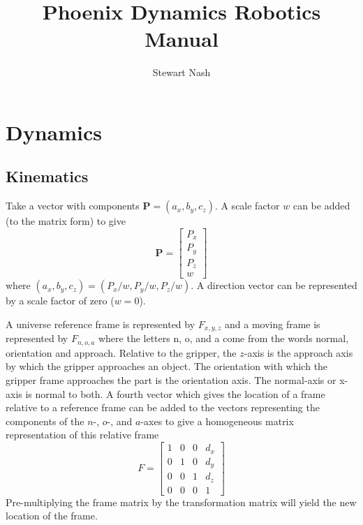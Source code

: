 \documentclass[11pt]{book}
\theoremstyle{example}
\begin{document}
\title{Phoenix Dynamics Robotics Manual}
\author{Stewart Nash}

\maketitle

\tableofcontents

\mainmatter

\chapter{Dynamics}

\section{Kinematics}

Take a vector with components $\mathbf{P}=(a_x,b_y,c_z)$. A scale factor $w$ can be added (to the matrix form) to give
\begin{equation}
	\mathbf{P}=
	\begin{bmatrix}
		P_x\\
		P_y\\
		P_z\\
		w
	\end{bmatrix}
\end{equation}
where $(a_x,b_y,c_z)=(P_x/w,P_y/w,P_z/w)$. A direction vector can be represented by a scale factor of zero ($w=0$).

A universe reference frame is represented by $F_{x,y,z}$ and a moving frame is represented by $F_{n,o,a}$ where the letters n, o, and a come from the words normal, orientation and approach. Relative to the gripper, the $z$-axis is the approach axis by which the gripper approaches an object. The orientation with which the gripper frame approaches the part is the orientation axis. The normal-axis or x-axis is normal to both. A fourth vector which gives the location of a frame relative to a reference frame can be added to the vectors representing the components of the $n$-, $o$-, and $a$-axes to give a homogeneous matrix representation of this relative frame
\begin{equation}
	F=
	\begin{bmatrix}
		1&0&0&d_x\\
		0&1&0&d_y\\
		0&0&1&d_z\\
		0&0&0&1
	\end{bmatrix}
\end{equation}
Pre-multiplying the frame matrix by the transformation matrix will yield the new location of the frame.
\end{document}
